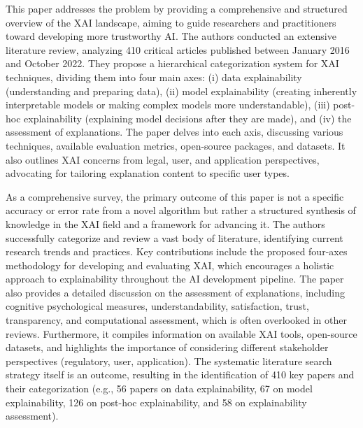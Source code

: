 This paper addresses the problem by providing a comprehensive and structured overview of the XAI landscape, aiming to guide researchers and practitioners toward developing more trustworthy AI. The authors conducted an extensive literature review, analyzing 410 critical articles published between January 2016 and October 2022. They propose a hierarchical categorization system for XAI techniques, dividing them into four main axes: (i) data explainability (understanding and preparing data), (ii) model explainability (creating inherently interpretable models or making complex models more understandable), (iii) post-hoc explainability (explaining model decisions after they are made), and (iv) the assessment of explanations. The paper delves into each axis, discussing various techniques, available evaluation metrics, open-source packages, and datasets. It also outlines XAI concerns from legal, user, and application perspectives, advocating for tailoring explanation content to specific user types.

As a comprehensive survey, the primary outcome of this paper is not a specific accuracy or error rate from a novel algorithm but rather a structured synthesis of knowledge in the XAI field and a framework for advancing it. The authors successfully categorize and review a vast body of literature, identifying current research trends and practices. Key contributions include the proposed four-axes methodology for developing and evaluating XAI, which encourages a holistic approach to explainability throughout the AI development pipeline. The paper also provides a detailed discussion on the assessment of explanations, including cognitive psychological measures, understandability, satisfaction, trust, transparency, and computational assessment, which is often overlooked in other reviews. Furthermore, it compiles information on available XAI tools, open-source datasets, and highlights the importance of considering different stakeholder perspectives (regulatory, user, application). The systematic literature search strategy itself is an outcome, resulting in the identification of 410 key papers and their categorization (e.g., 56 papers on data explainability, 67 on model explainability, 126 on post-hoc explainability, and 58 on explainability assessment).

